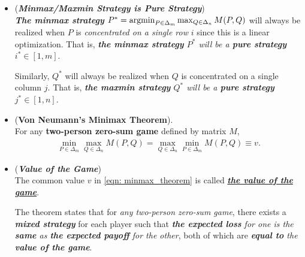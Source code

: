 \documentclass[11pt]{article}
\begin{document}
\begin{itemize}
\item \begin{remark}(\textbf{\emph{Minmax/Maxmin Strategy is Pure Strategy}}) \\
\emph{\textbf{The minmax strategy}} $P^{*} = \operatorname{argmin}_{P \in \Delta_{m}} \max_{Q \in \Delta_{n}}M(P, Q)$ will always be realized when $P$ is
\emph{concentrated on a single row} $i$ since this is a linear optimization. That is, \emph{\textbf{the minmax strategy} $P^{*}$ will be a \textbf{pure strategy} $i^{*} \in [1, m]$}.

Similarly, $Q^{*}$ will always be realized when $Q$ is concentrated on a single column $j$. That is,  \emph{\textbf{the maxmin strategy} $Q^{*}$ will be a \textbf{pure strategy} $j^{*} \in [1, n]$}.
\end{remark}

\item \begin{theorem} (\textbf{Von Neumann's Minimax Theorem}). \citep{schapire2012boosting, mohri2018foundations} \\
For any \textbf{two-person zero-sum game} defined by matrix $M$,
\begin{align}
\min_{P \in \Delta_{m}}\max_{Q \in \Delta_{n}}M(P, Q) = \max_{Q \in \Delta_{n}}\min_{P \in \Delta_{m}}M(P, Q) \equiv v. \label{eqn: minmax_theorem}
\end{align} 
\end{theorem}

\item \begin{remark}(\textbf{\emph{Value of the Game}})\\
The common value $v$ in \eqref{eqn: minmax_theorem} is called \underline{\emph{\textbf{the value of the game}}}. 

The theorem states that for \emph{any two-person zero-sum game}, there exists a \emph{\textbf{mixed strategy}} for each player such that \emph{\textbf{the expected loss} for one is the \textbf{same} as \textbf{the expected payoff} for the other}, both of which are \emph{\textbf{equal to} the \textbf{value of the game}}.
\end{remark}


\end{itemize}
\end{document}
